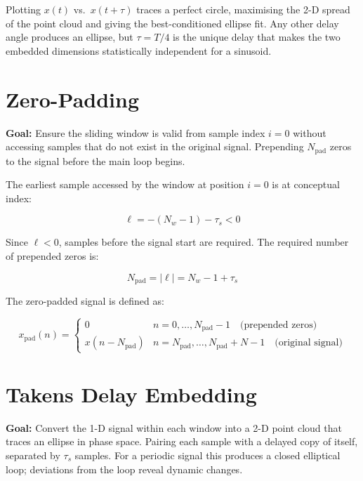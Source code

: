 \documentclass{article}
\begin{document}
	Plotting $x(t)$ vs.\ $x(t+\tau)$ traces a perfect circle,
	maximising the 2-D spread of the point cloud and giving
	the best-conditioned ellipse fit.
	Any other delay angle produces an ellipse, but $\tau = T/4$
	is the unique delay that makes the two embedded dimensions
	statistically independent for a sinusoid.
	

	\section{Zero-Padding}
	
	
	\textbf{Goal:} Ensure the sliding window is valid from sample
	index $i=0$ without accessing samples that do not exist
	in the original signal.
	Prepending $N_{\text{pad}}$ zeros to the signal
	before the main loop begins.
	
	The earliest sample accessed by the window at position $i=0$
	is at conceptual index:
	
	\begin{equation}
		\ell = -(N_w - 1) - \tau_s < 0
	\end{equation}
	
	Since $\ell < 0$, samples before the signal start are required.
	The required number of prepended zeros is:
	
	\begin{equation}
		N_{\text{pad}} = |\ell| = N_w - 1 + \tau_s
	\end{equation}
	
	The zero-padded signal is defined as:
	
	\begin{equation}
		x_{\text{pad}}(n) =
		\begin{cases}
			0                  & n = 0, \ldots, N_{\text{pad}}-1
			\quad \text{(prepended zeros)} \\
			x(n - N_{\text{pad}}) & n = N_{\text{pad}}, \ldots,
			N_{\text{pad}}+N-1
			\quad \text{(original signal)}
		\end{cases}
	\end{equation}
	

	\section{Takens Delay Embedding}
	
	
	\textbf{Goal:} Convert the 1-D signal within each window
	into a 2-D point cloud that traces an ellipse in phase space.
    Pairing each sample with a delayed copy of itself,
	separated by $\tau_s$ samples.
	For a periodic signal this produces a closed elliptical loop;
	deviations from the loop reveal dynamic changes.
	
\end{document}
